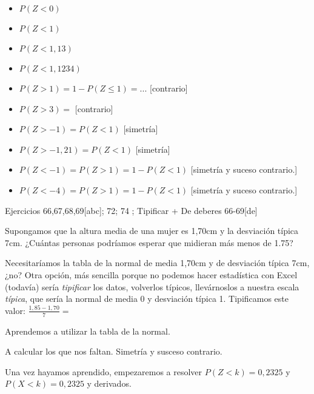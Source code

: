 \begin{itemize}
	\item $P(Z<0)$
	\item $P(Z<1)$
	\item $P(Z<1,13)$
	\item $P(Z<1,1234)$
	\item $P(Z > 1) = 1 - P(Z\leq 1) = ...$ [contrario]
	\item $P(Z > 3) = $ [contrario]
	\item $P(Z  > -1) = P(Z < 1)$ [simetría]
	\item $P(Z  > -1,21) = P(Z < 1)$ [simetría]
	\item $P(Z  < -1) = P(Z > 1) = 1 - P(Z<1)$ [simetría y suceso contrario.]
	\item $P(Z  < -4) = P(Z > 1) = 1 - P(Z<1)$ [simetría y suceso contrario.]
\end{itemize}

Ejercicios 66,67,68,69[abc]; 72; 74 ; Tipificar + De deberes 66-69[de]

Supongamos que la altura media de una mujer es 1,70cm y la desviación típica 7cm. ¿Cuántas personas podríamos esperar que midieran más menos de 1.75?

Necesitaríamos la tabla de la normal de media 1,70cm y de desviación típica 7cm, ¿no? Otra opción, más sencilla porque no podemos hacer estadística con Excel (todavía) sería \textit{tipificar} los datos, volverlos típicos, llevárnoslos a nuestra escala \textit{típica}, que sería la normal de media 0 y desviación típica 1. Tipificamos este valor: $\frac{1,85-1,70}{7} = $

Aprendemos a utilizar la tabla de la normal. 

A calcular los que nos faltan. Simetría y susceso contrario.

Una vez hayamos aprendido, empezaremos a resolver $P(Z<k) = 0,2325$ y $P(X<k) = 0,2325$ y derivados.


